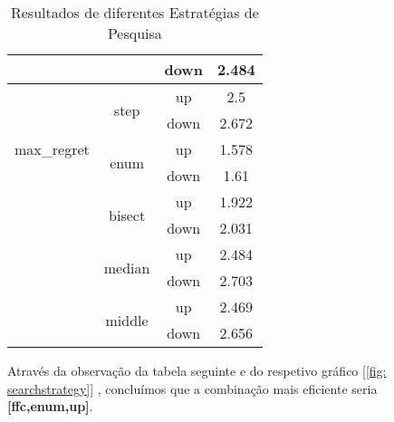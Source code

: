 \begin{table}[h!]
{\begin{tabular}{|c|c|c|c|}
                            &                         & down & 2.484 \\
 \hline
\multirow{5}{*}{max_regret} & \multirow{2}{*}{step} & up & 2.5 \\ 
                            &                         & down & 2.672 \\
                            & \multirow{2}{*}{enum} & up & 1.578 \\ 
                            &                         & down & 1.61 \\
                            & \multirow{2}{*}{bisect} & up & 1.922 \\ 
                            &                         & down & 2.031 \\
                            & \multirow{2}{*}{median} & up & 2.484 \\ 
                            &                         & down & 2.703 \\
                            & \multirow{2}{*}{middle} & up & 2.469 \\ 
                            &                         & down & 2.656 \\
 \hline
\end{tabular}
}
\caption{Resultados de diferentes Estratégias de Pesquisa}
\label{table: search_analisys}
\end{table}
Através da observação da tabela seguinte e do respetivo gráfico  [\ref{fig: searchstrategy}] , concluímos que a combinação mais eficiente seria \textbf{[ffc,enum,up]}.